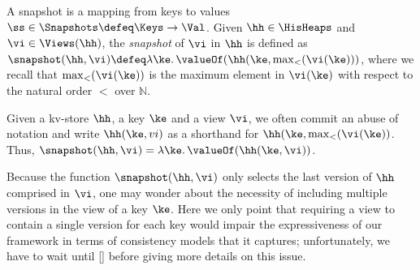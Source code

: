 \begin{definition}[Snapshots]
\label{def:heaps}
\label{def:snapshot}
A snapshot is a mapping from keys to values \( \ss \in \Snapshots  \defeq \Keys \to \Val\).
Given $\hh \in \HisHeaps$ and $\vi \in \Views(\hh)$, the \emph{snapshot} of $\vi$ in 
$\hh$ is defined as $\snapshot(\hh, \vi) \defeq \lambda \ke \ldotp \valueOf(\hh(\ke, \max_{<}(\vi(\ke)))$, 
where we recall that $\max_{<}(\vi(\ke))$ is the maximum element in $\vi(\ke)$ with respect to the natural 
order $<$ over $\mathbb{N}$.
\end{definition}
Given a kv-store $\hh$, a key $\ke$ and a view $\vi$, we often commit an abuse of notation and write 
$\hh(\ke, vi)$ as a shorthand for 
$\hh(\ke, \max_{<}(\vi(\ke))$. Thus, $\snapshot(\hh, \vi) = \lambda \ke \ldotp \valueOf(\hh(\ke, \vi))$. 

\begin{remark}
Because the function $\snapshot(\hh, \vi)$ only selects the last version of $\hh$ comprised 
in $\vi$, one may wonder about the necessity of including multiple versions in the view of a 
key $\ke$.  Here we only point that requiring a view to contain a single version for each key 
would impair the expressiveness of our framework in terms of consistency models that it captures; 
unfortunately, we have to wait until \cref{} before giving more details on this issue.
\end{remark}

%  
%


